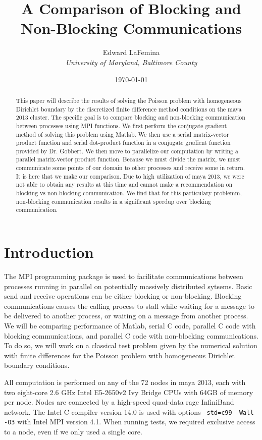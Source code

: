 \documentclass[11pt]{article}
\author{Edward LaFemina \\
		\it{University of Maryland, Baltimore County}}
\title{A Comparison of Blocking and Non-Blocking Communications}
\date{\today}
\begin{document}
\maketitle

\begin{abstract}
This paper will describe the results of solving the Poisson problem with homogeneous Dirichlet boundary by the discretized finite difference method conditions on the maya 2013 cluster. The specific goal is to compare blocking and non-blocking communication between processes using MPI functions. We first perform the conjugate gradient method of solving this problem using Matlab. We then use a serial matrix-vector product function and serial dot-product function in a conjugate gradient function provided by Dr. Gobbert. We then move to parallelize our computation by writing a parallel matrix-vector product function. Because we must divide the matrix, we must communicate some points of our domain to other processes and receive some in return. It is here that we make our comparison. Due to high utilization of maya 2013, we were not able to obtain any results at this time and cannot make a recommendation  on blocking vs non-blocking communication. We find that for this particulary problemm, non-blocking communication results in a significant speedup over blocking communication.
\end{abstract}
\section{Introduction}
The MPI programming package is used to facilitate communications between processes running in parallel on potentially massively distributed sytsems. Basic send and receive operations can be either blocking or non-blocking. Blocking communications causes the calling process to stall while waiting for a message to be delivered to another process, or waiting on a message from another process. We will be comparing performance of Matlab, serial C code, parallel C code with blocking communications, and parallel C code with non-blocking communications. To do so, we will work on a classical test problem given by the numerical solution with finite differences for the Poisson problem with homogeneous Dirichlet boundary conditions.

All computation is performed on any of the 72 nodes in maya 2013, each with two eight-core 2.6 GHz Intel E5-2650v2 Ivy Bridge CPUs with 64GB of memory per node. Nodes are connected by a high-speed quad-data rage InfiniBand network. The Intel C compiler version 14.0 is used with options \texttt{-std=c99 -Wall -O3} with Intel MPI version 4.1. When running tests, we required exclusive access to a node, even if we only used a single core.
\end{document}
